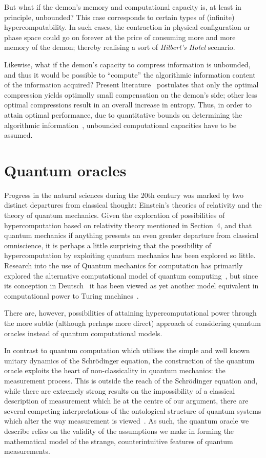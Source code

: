 \documentclass[10pt]{article}
\begin{document}
But what if the demon's memory and computational capacity is, at least in principle, unbounded?
This case corresponds to certain types of (infinite) hypercomputability.
In such cases, the contraction in physical configuration or phase space
could go on forever at the price of consuming more and more memory of the demon;
thereby realising a sort of {\em Hilbert's Hotel} scenario.

Likewise, what if the demon's capacity to compress information is unbounded, and thus it would be possible to ``compute'' the algorithmic
information content of the information acquired?
Present literature~\cite{681318} postulates that only the optimal compression
yields optimally small compensation on the demon's side;
other less optimal compressions result in an overall increase in entropy.
Thus, in order to attain optimal performance,  due to
quantitative bounds on determining the algorithmic information~\cite[Section~8.2]{calude:02},
unbounded computational capacities have to be assumed.


\section{Quantum oracles}


Progress in the natural sciences during the 20th century was marked by two distinct departures from classical thought:
Einstein's theories of relativity and the theory of quantum mechanics.
Given the exploration of possibilities of hypercomputation based on relativity theory mentioned in Section~4, and that quantum mechanics if anything presents an even greater departure from classical omniscience, it is perhaps a little surprising that the possibility of hypercomputation by exploiting quantum mechanics has been explored so little.
Research into the use of Quantum mechanics for computation has primarily explored the alternative computational model of quantum computing~\cite{Gruska}, but since its conception in Deutsch~\cite{deutsch} it has been viewed as yet another model equivalent in computational power to Turing machines~\cite{be-va}.

There are, however, possibilities of attaining hypercomputational power through the more subtle (although perhaps more direct) approach of considering quantum oracles instead of quantum computational models.

In contrast to quantum computation which utilises the simple and well known unitary dynamics of the Schr\"odinger equation, the construction of the quantum oracle exploits the heart of non-classicality in quantum mechanics: the measurement process.
This is outside the reach of the Schr\"odinger equation and, while there are extremely strong results on the impossibility of a classical description of measurement which lie at the centre of our argument, there are several competing interpretations of the ontological structure of quantum systems which alter the way measurement is viewed~\cite{wheeler-Zurek:83}.
As such, the quantum oracle we describe relies on the validity of the assumptions we make in forming the mathematical model of the strange, counterintuitive features of quantum measurements.
\end{document}
